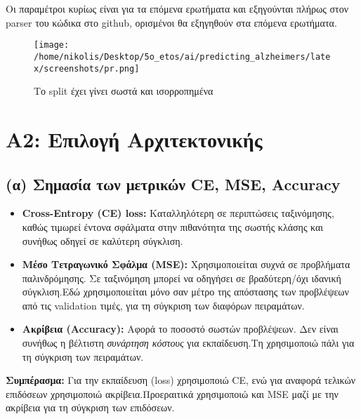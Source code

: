 \documentclass[a4paper,11pt]{article}
\begin{document}
Οι παραμέτροι κυρίως είναι για τα επόμενα ερωτήματα και εξηγούνται πλήρως στον parser του κώδικα στο github, ορισμένοι 
θα εξηγηθούν στα επόμενα ερωτήματα.

\begin{figure}[H]
    \centering
    \texttt{[image: /home/nikolis/Desktop/5o\_etos/ai/predicting\_alzheimers/latex/screenshots/pr.png]}
    \caption{Το split έχει γίνει σωστά και ισορροπημένα}
    \label{fig:two_thirds}
\end{figure}
\section{A2: Επιλογή Αρχιτεκτονικής}

\subsection{(α) Σημασία των μετρικών CE, MSE, Accuracy}
\begin{itemize}
  \item \textbf{Cross-Entropy (CE) loss:} Καταλληλότερη σε περιπτώσεις ταξινόμησης, καθώς τιμωρεί έντονα σφάλματα στην πιθανότητα της σωστής κλάσης και συνήθως οδηγεί σε καλύτερη σύγκλιση.
  \item \textbf{Μέσο Τετραγωνικό Σφάλμα (MSE):} Χρησιμοποιείται συχνά σε προβλήματα παλινδρόμησης. Σε ταξινόμηση μπορεί να οδηγήσει σε βραδύτερη/όχι ιδανική σύγκλιση.Εδώ χρησιμοποιείται μόνο σαν μέτρο της 
  απόστασης των προβλέψεων από τις validation τιμές, για τη σύγκριση των διαφόρων πειραμάτων.
  \item \textbf{Ακρίβεια (Accuracy):} Αφορά το ποσοστό σωστών προβλέψεων. Δεν είναι συνήθως η βέλτιστη \emph{συνάρτηση κόστους} για εκπαίδευση.Τη χρησιμοποιώ πάλι για τη σύγκριση των πειραμάτων.
\end{itemize}
\noindent
\textbf{Συμπέρασμα:} Για την εκπαίδευση (loss) χρησιμοποιώ CE, ενώ για αναφορά
τελικών επιδόσεων χρησιμοποιώ ακρίβεια.Προεραιτικά χρησιμοποιώ και MSE μαζί με την ακρίβεια για τη σύγκριση των επιδόσεων.
\end{document}
